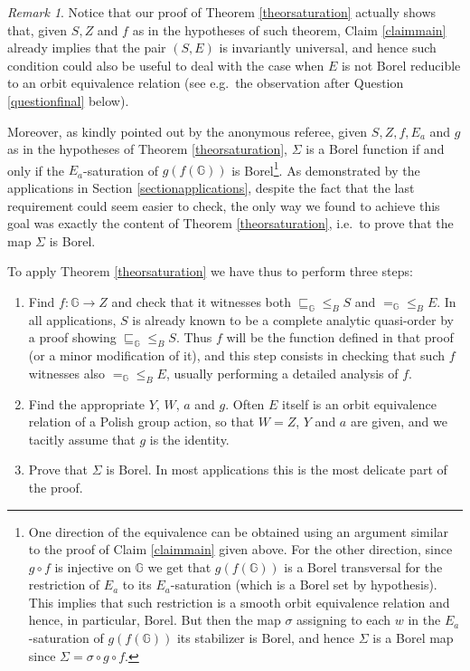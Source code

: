 \documentclass{amsart}
\theoremstyle{definition}
\theoremstyle{remark}
\newtheorem{remark}[theorem]{Remark}
\begin{document}
\begin{remark}
Notice that our proof of Theorem \ref{theorsaturation} actually shows that, given $S,Z$ and $f$ as in the hypotheses of such theorem, Claim \ref{claimmain} already implies that the pair $(S,E)$ is invariantly universal, and hence such condition could also be useful to deal with the case when $E$ is not Borel reducible to an orbit equivalence relation (see e.g.\ the observation after Question \ref{questionfinal} below).

Moreover,
as kindly pointed out by the anonymous referee, given $S,Z,f,E_a$ and $g$ as in the hypotheses of Theorem \ref{theorsaturation}, $\Sigma$ is a Borel function if and only if the $E_a$-saturation of $g(f({\mathbb{G}}))$ is Borel\footnote{One direction of the equivalence can be obtained using an argument similar to the proof of Claim \ref{claimmain} given above. For the other direction, since $g \circ f$ is injective on ${\mathbb{G}}$ we get that $g(f({\mathbb{G}}))$ is a Borel transversal for the restriction of $E_a$ to its $E_a$-saturation (which is a Borel set by hypothesis). This implies that such restriction is a smooth orbit equivalence relation and hence, in particular, Borel. But then the map $\sigma$ assigning to each $w$ in the $E_a$-saturation of $g(f({\mathbb{G}}))$ its stabilizer is Borel, and hence $\Sigma$ is a Borel map since $\Sigma = \sigma \circ g \circ f$.}.
As demonstrated by the applications in Section \ref{sectionapplications},  despite the fact that the last requirement could seem easier to check, the only way we found to achieve this goal was exactly the content of Theorem \ref{theorsaturation}, i.e.\ to prove that the map $\Sigma$ is Borel.
\end{remark}

To apply Theorem \ref{theorsaturation} we have thus to perform three
steps:
\begin{enumerate}[\quad(a)]
\item Find $f \colon {\mathbb{G}} \to Z$ and check that it witnesses both
    ${\sqsubseteq_{\mathbb{G}}} \leq_B S$ and ${=_{\mathbb{G}}} \leq_B E$. In all
    applications, $S$ is already known to be a complete analytic quasi-order
    by a proof showing ${\sqsubseteq_{\mathbb{G}}} \leq_B S$. Thus $f$ will be the
    function defined in that proof (or a minor modification of it),
    and this step consists in
    checking that such $f$ witnesses also ${=_{\mathbb{G}}} \leq_B E$, usually
    performing a detailed analysis of $f$.
\item Find the appropriate $Y$, $W$, $a$ and $g$. Often $E$ itself
    is an orbit equivalence relation of a Polish group action, so
    that $W=Z$, $Y$ and $a$ are given, and we tacitly assume
    that $g$ is the identity.
\item Prove that $\Sigma$ is Borel. In most applications
    this is the most delicate part of the proof.
\end{enumerate}
\end{document}

